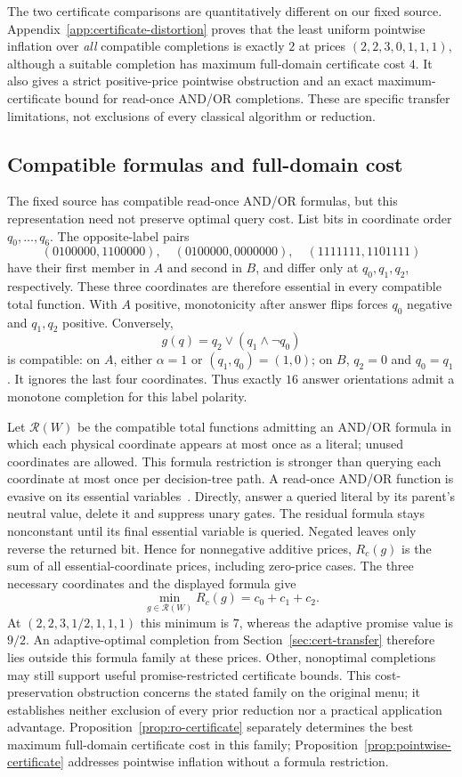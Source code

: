 \documentclass[pdflatex,sn-mathphys-num]{sn-jnl}
\theoremstyle{thmstyleone}
\theoremstyle{thmstylethree}
\theoremstyle{thmstyletwo}
\begin{document}
The two certificate comparisons are quantitatively different on our fixed source. Appendix~\ref{app:certificate-distortion} proves that the least uniform pointwise inflation over \emph{all} compatible completions is exactly $2$ at prices $(2,2,3,0,1,1,1)$, although a suitable completion has maximum full-domain certificate cost $4$. It also gives a strict positive-price pointwise obstruction and an exact maximum-certificate bound for read-once AND/OR completions. These are specific transfer limitations, not exclusions of every classical algorithm or reduction.


\subsection{Compatible formulas and full-domain cost}\label{sec:ro-completion}
The fixed source has compatible read-once AND/OR formulas, but this representation need not preserve optimal query cost. List bits in coordinate order $q_0,\ldots,q_6$. The opposite-label pairs
\[
 (0100000,1100000),\quad(0100000,0000000),\quad
 (1111111,1101111)
\]
have their first member in $A$ and second in $B$, and differ only at $q_0,q_1,q_2$, respectively. These three coordinates are therefore essential in every compatible total function. With $A$ positive, monotonicity after answer flips forces $q_0$ negative and $q_1,q_2$ positive. Conversely,
\[
 g(q)=q_2\lor(q_1\land\neg q_0)
\]
is compatible: on $A$, either $\alpha=1$ or $(q_1,q_0)=(1,0)$; on $B$, $q_2=0$ and $q_0=q_1$. It ignores the last four coordinates. Thus exactly $16$ answer orientations admit a monotone completion for this label polarity.

Let $\mathcal R(W)$ be the compatible total functions admitting an AND/OR formula in which each physical coordinate appears at most once as a literal; unused coordinates are allowed. This formula restriction is stronger than querying each coordinate at most once per decision-tree path. A read-once AND/OR function is evasive on its essential variables~\cite{charikar02}. Directly, answer a queried literal by its parent's neutral value, delete it and suppress unary gates. The residual formula stays nonconstant until its final essential variable is queried. Negated leaves only reverse the returned bit. Hence for nonnegative additive prices, $R_c(g)$ is the sum of all essential-coordinate prices, including zero-price cases. The three necessary coordinates and the displayed formula give
\[
 \min_{g\in\mathcal R(W)}R_c(g)=c_0+c_1+c_2.
\]
At $(2,2,3,1/2,1,1,1)$ this minimum is $7$, whereas the adaptive promise value is $9/2$. An adaptive-optimal completion from Section~\ref{sec:cert-transfer} therefore lies outside this formula family at these prices. Other, nonoptimal completions may still support useful promise-restricted certificate bounds. This cost-preservation obstruction concerns the stated family on the original menu; it establishes neither exclusion of every prior reduction nor a practical application advantage. Proposition~\ref{prop:ro-certificate} separately determines the best maximum full-domain certificate cost in this family; Proposition~\ref{prop:pointwise-certificate} addresses pointwise inflation without a formula restriction.
\end{document}
